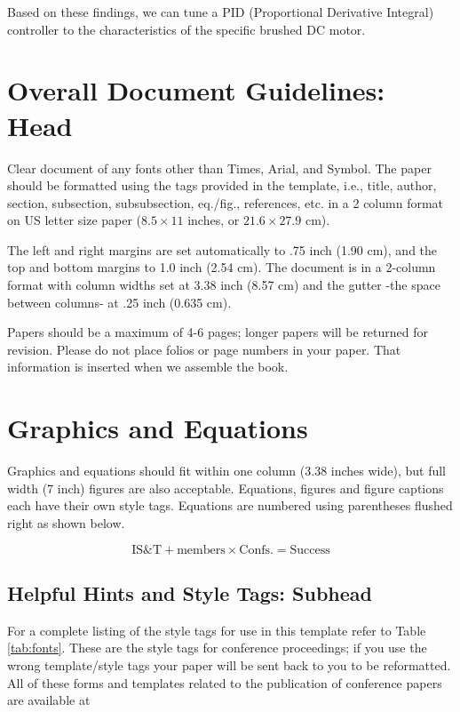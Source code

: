 \documentclass[letterpaper,twocolumn,fleqn]{article}
\begin{document}
Based on these findings, we can tune a PID (Proportional Derivative Integral) controller to the characteristics of the specific brushed DC motor.
\vspace{0.15in}


\clearpage
\section{Overall Document Guidelines: Head}
\label{sec:intro}

Clear document of any fonts other than Times, Arial, and Symbol. The
paper should be formatted using the tags provided in the template,
i.e., title, author, section, subsection, subsubsection, eq./fig.,
references, etc.  in a 2 column format on US letter size paper ($8.5
\times 11$ inches, or $21.6 \times 27.9$ cm).

The left and right margins are set automatically to .75 inch (1.90 cm),
and the top and bottom margins to 1.0 inch (2.54 cm). The document is in
a 2-column format with column widths set at 3.38 inch (8.57 cm) and the
gutter -the space between columns- at .25 inch (0.635 cm).

Papers should be a maximum of 4-6 pages; longer papers will be
returned for revision. Please do not place folios or page numbers in
your paper. That information is inserted when we assemble the book.


\section{Graphics and Equations}
Graphics and equations should fit within one column (3.38 inches
wide), but full width (7 inch) figures are also acceptable. Equations,
figures and figure captions each have their own style tags. Equations
are numbered using parentheses flushed right as shown below.

\begin{equation}
\label{eq:ist}
\textrm{IS\&T} + \textrm{members} \times \textrm{Confs.} = \textrm{Success}
\end{equation}


\subsection{Helpful Hints and Style Tags: Subhead}
For a complete listing of the style tags for use in this template
refer to Table \ref{tab:fonts}. These are the style tags for
conference proceedings; if you use the wrong template/style tags your
paper will be sent back to you to be reformatted.  All of these forms
and templates related to the publication of conference papers are
available at
\end{document}
